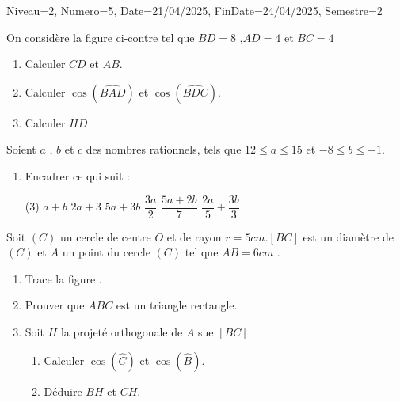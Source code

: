 \documentclass[a4paper,12pt]{article}
\begin{document}
\begin{Maquette}[DM]{Niveau=2, Numero=5, Date=21/04/2025, FinDate=24/04/2025, Semestre=2}

\begin{exercice}
\begin{minipage}{.6\linewidth}
On considère la figure ci-contre tel que $BD=8$ ,$AD=4$ et $BC=4$
\begin{enumerate}
\item Calculer $CD$ et $AB$.
\item Calculer $\cos(\widehat{BAD})$ et $\cos(\widehat{BDC})$.
\item Calculer $HD$
\end{enumerate}
\end{minipage}
\begin{minipage}{.4\linewidth}
\end{minipage}
\end{exercice}


\begin{exercice}
Soient $a$ , $b$ et $c$ des nombres rationnels, tels que $12\leq a \leq15$ et $-8\leq b \leq -1$.
\begin{enumerate}
\item Encadrer ce qui suit :
\begin{tasks}[style=itemize](3)
\task $a+b$
\task $2a+3$
\task $5a+3b$
\task $\dfrac{3a}{2}$
\task $\dfrac{5a+2b}{7}$
\task $\dfrac{2a}{5}+\dfrac{3b}{3}$
\end{tasks}
\end{enumerate}
\end{exercice}

\begin{exercice}
Soit $(C)$ un cercle de centre $O$ et de rayon $r=5cm$.$[BC]$ est un diamètre de $(C)$ et $A$ un point du cercle $(C)$ tel que $AB=6cm$ .
\begin{enumerate}
\item Trace la figure .
\item Prouver que $ABC$ est un triangle rectangle.
\item Soit $H$ la projeté orthogonale de $A$ sue $[BC]$.
\begin{enumerate}
\item Calculer $\cos(\widehat{C})$ et  $\cos(\widehat{B})$.
\item Déduire $BH$ et $CH$.
\end{enumerate}
\end{enumerate}
\end{exercice}


\end{Maquette}
\end{document}
